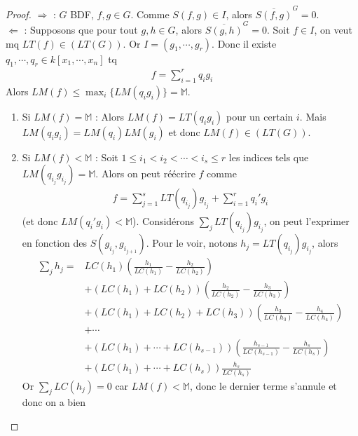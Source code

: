         \begin{proof}
            $\Rightarrow$ : $G$ BDF, $f,g \in G$. Comme $S(f,g) \in I$, alors $\overline{S(f,g)}^G = 0$. \\
            $\Leftarrow$ : Supposons que pour tout $g,h \in G$, alors $\overline{S(g,h)}^G = 0$. Soit $f \in I$, on veut mq $LT(f) \in (LT(G))$. Or $I = (g_1, \cdots, g_r)$. Donc il existe $q_1, \cdots, q_r \in k[x_1, \cdots, x_n]$ tq 
            \begin{align*}
                f = \sum_{i = 1}^r q_ig_i
            \end{align*}
            Alors $LM(f) \leq \max_i \{LM(q_ig_i)\} = \mathbb{M}$.
            \begin{enumerate}
                \item Si $LM(f) = \mathbb{M}$ : Alors $LM(f) = LT(q_ig_i)$ pour un certain $i$. Mais $LM(q_ig_i) = LM(q_i)LM(g_i)$ et donc $LM(f) \in (LT(G))$.
                \item Si $LM(f) < \mathbb{M}$ : Soit $1 \leq i_1 < i_2 < \cdots < i_s \leq r$ les indices tels que $LM(q_{i_j}g_{i_j}) = \mathbb{M}$. Alors on peut réécrire $f$ comme
                \begin{align*}
                    f = \sum_{j = 1}^s LT(q_{i_j})g_{i_j} + \sum_{i = 1}^r q_i'g_i
                \end{align*}
                (et donc $LM(q_i'g_i) < \mathbb{M}$). Considérons $\sum_j LT(q_{i_j})g_{i_j}$, on peut l'exprimer en fonction des $S(g_{i_j}, g_{i_{j+1}})$. Pour le voir, notons $h_j = LT(q_{i_j})g_{i_j}$, alors
                \begin{align*}
                    \sum_j h_j = &LC(h_1)\left( \frac{h_1}{LC(h_1)} - \frac{h_2}{LC(h_2)} \right) \\
                    &+ (LC(h_1) + LC(h_2))\left( \frac{h_2}{LC(h_2)} - \frac{h_3}{LC(h_3)} \right) \\
                    &+ (LC(h_1) + LC(h_2) + LC(h_3))\left( \frac{h_3}{LC(h_3)} - \frac{h_4}{LC(h_4)} \right) \\
                    & + \cdots \\
                    &+(LC(h_1) + \cdots + LC(h_{s-1}))\left( \frac{h_{s-1}}{LC(h_{s-1})} - \frac{h_s}{LC(h_s)} \right) \\
                    &+ (LC(h_1) + \cdots + LC(h_s))\frac{h_s}{LC(h_s)}
                \end{align*}
                Or $\sum_j LC(h_j) = 0$ car $LM(f) < \mathbb{M}$, donc le dernier terme s'annule et donc on a bien

\end{enumerate}
\end{proof}
